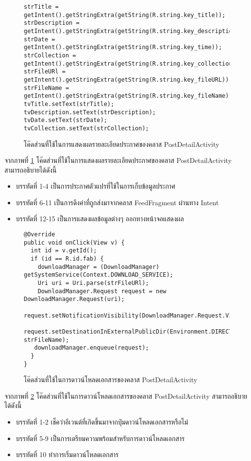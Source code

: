 {\begin{figure}[H]
{\begin{lstlisting}
strTitle = getIntent().getStringExtra(getString(R.string.key_title));
strDescription = getIntent().getStringExtra(getString(R.string.key_description));
strDate = getIntent().getStringExtra(getString(R.string.key_time));
strCollection = getIntent().getStringExtra(getString(R.string.key_collection));
strFileURl = getIntent().getStringExtra(getString(R.string.key_fileURL));
strFileName = getIntent().getStringExtra(getString(R.string.key_fileName));
tvTitle.setText(strTitle);
tvDescription.setText(strDescription);
tvDate.setText(strDate);
tvCollection.setText(strCollection);
			\end{lstlisting}}
		\caption{โค๊ดส่วนที่ใช้ในการแสดงผลรายละเอียดประกาศของคลาส PostDetailActivity}
		\label{Fig:PostDetailActivity}
	\end{figure}
	จากภาพที่ \ref{Fig:PostDetailActivity} โค๊ดส่วนที่ใช้ในการแสดงผลรายละเอียดประกาศของคลาส  PostDetailActivity สามารถอธิบายได้ดังนี้
	\begin{itemize}[label={--}]
		\item บรรทัดที่ 1-4 เป็นการประกาศตัวแปรที่ใช้ในการเก็บข้อมูลประกาศ
		\item บรรทัดที่ 6-11 เป็นการดึงค่าที่ถูกส่งมาจากคลาส FeedFragment ผ่านทาง Intent
		\item บรรทัดที่ 12-15 เป็นการแสดงผลข้อมูลต่างๆ ออกทางหน้าจอแสดงผล
	\end{itemize}
	\begin{figure}[H]
		{\begin{lstlisting}
@Override
public void onClick(View v) {
  int id = v.getId();
  if (id == R.id.fab) {
    downloadManager = (DownloadManager) getSystemService(Context.DOWNLOAD_SERVICE);
    Uri uri = Uri.parse(strFileURl);
    DownloadManager.Request request = new DownloadManager.Request(uri);
    request.setNotificationVisibility(DownloadManager.Request.VISIBILITY_VISIBLE_NOTIFY_COMPLETED);
    request.setDestinationInExternalPublicDir(Environment.DIRECTORY_DOWNLOADS, strFileName);
   downloadManager.enqueue(request);
  }
}
			\end{lstlisting}}
		\caption{โค๊ดส่วนที่ใช้ในการดาวน์โหลดเอกสารของคลาส PostDetailActivity}
		\label{Fig:PostDetailActivity2}
	\end{figure}
	จากภาพที่ \ref{Fig:PostDetailActivity2} โค๊ดส่วนที่ใช้ในการดาวน์โหลดเอกสารของคลาส PostDetailActivity สามารถอธิบายได้ดังนี้
	\begin{itemize}[label={--}]
		\item บรรทัดที่ 1-2 เช็คว่าอีเวนต์ที่เกิดขึ้นมาจากปุ่มดาวน์โหลดเอกสารหรือไม่
		\item บรรทัดที่ 5-9 เป็นการเตรียมความพร้อมสำหรับการดาวน์โหลดเอกสาร
		\item บรรทัดที่ 10 ทำการเริ่มดาวน์โหลดเอกสาร
	\end{itemize}
	
}
